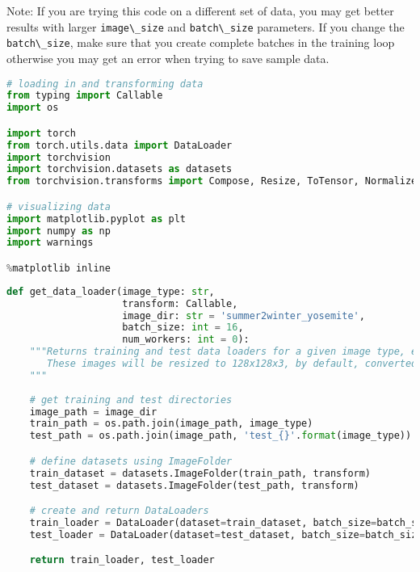 Note: If you are trying this code on a different set of data, you may
get better results with larger \lstinline{image\_size} and
\lstinline{batch\_size} parameters. If you change the
\lstinline{batch\_size}, make sure that you create
complete batches in the training loop otherwise you may get an error
when trying to save sample data.
\begin{lstlisting}[language=Python]
# loading in and transforming data
from typing import Callable
import os

import torch
from torch.utils.data import DataLoader
import torchvision
import torchvision.datasets as datasets
from torchvision.transforms import Compose, Resize, ToTensor, Normalize 

# visualizing data
import matplotlib.pyplot as plt
import numpy as np
import warnings

%matplotlib inline
\end{lstlisting}

\begin{lstlisting}[language=Python]
def get_data_loader(image_type: str, 
                    transform: Callable,
                    image_dir: str = 'summer2winter_yosemite', 
                    batch_size: int = 16, 
                    num_workers: int = 0):
    """Returns training and test data loaders for a given image type, either 'summer' or 'winter'. 
       These images will be resized to 128x128x3, by default, converted into Tensors, and normalized.
    """
    
    # get training and test directories
    image_path = image_dir
    train_path = os.path.join(image_path, image_type)
    test_path = os.path.join(image_path, 'test_{}'.format(image_type))

    # define datasets using ImageFolder
    train_dataset = datasets.ImageFolder(train_path, transform)
    test_dataset = datasets.ImageFolder(test_path, transform)

    # create and return DataLoaders
    train_loader = DataLoader(dataset=train_dataset, batch_size=batch_size, shuffle=True, num_workers=num_workers)
    test_loader = DataLoader(dataset=test_dataset, batch_size=batch_size, shuffle=False, num_workers=num_workers)

    return train_loader, test_loader
\end{lstlisting}

